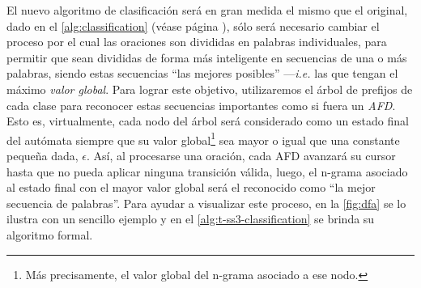 El nuevo algoritmo de clasificación será en gran medida el mismo que el original, dado en el \autoref{alg:classification} (véase página \pageref{alg:classification}), sólo será necesario cambiar el proceso por el cual las oraciones son divididas en palabras individuales, para permitir que sean divididas de forma más inteligente en secuencias de una o más palabras,
siendo estas secuencias ``las mejores posibles'' ---\emph{i.e.} las que tengan el máximo \emph{valor global}.
Para lograr este objetivo, utilizaremos el árbol de prefijos de cada clase para reconocer estas secuencias importantes como si fuera un \emph{\ac{AFD}}.
Esto es, virtualmente, cada nodo del árbol será considerado como un estado final del autómata siempre que su valor global\footnote{Más precisamente, el valor global del n-grama asociado a ese nodo.} sea mayor o igual que una constante pequeña dada, $\epsilon$.
Así, al procesarse una oración, cada \ac{AFD} avanzará su cursor hasta que no pueda aplicar ninguna transición válida, luego, el n-grama asociado al estado final con el mayor valor global será el reconocido como ``la mejor secuencia de palabras''.
Para ayudar a visualizar este proceso, en la \autoref{fig:dfa} se lo ilustra con un sencillo ejemplo y en el \autoref{alg:t-ss3-classification} se brinda su algoritmo formal.

